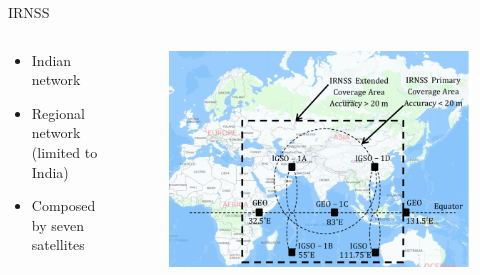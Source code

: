 \begin{frame}{IRNSS}

    \begin{columns}[t]
        \begin{column}[t]{0.4\textwidth}
            \begin{itemize}
                \item Indian network
                \vspace{0.2cm}
                \item Regional network (limited to India)
                \vspace{0.2cm}
                \item Composed by seven satellites
            \end{itemize}
        \end{column}
        \begin{column}[t]{0.6\textwidth}
            \begin{figure}[!ht]
                \begin{center}
                    \includegraphics[width=0.9\columnwidth]{figures/irnss}
                \end{center}
            \end{figure}
        \end{column}
    \end{columns}

\end{frame}

